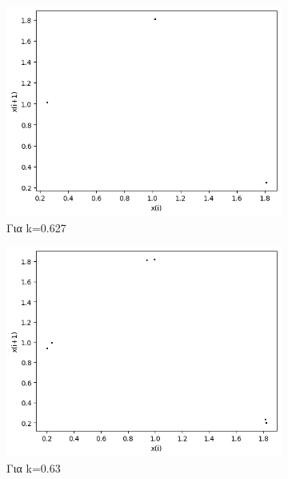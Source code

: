 \begin{figure}[h!]
\begin{subfigure}[b]{0.4\textwidth}
		\includegraphics[width=\textwidth]{LateX images/graphs q07/g10}
		\caption{Για k=0.627}
		\label{f:k44}
	\end{subfigure}
	\hfill
	\begin{subfigure}[b]{0.4\textwidth}
		\centering
		\includegraphics[width=\textwidth]{LateX images/graphs q07/g11}
		\caption{Για k=0.63}
		\label{f:k45}
	\end{subfigure}
	\hfill
	\begin{subfigure}[b]{0.4\textwidth}
		\centering

\end{subfigure}
\end{figure}
